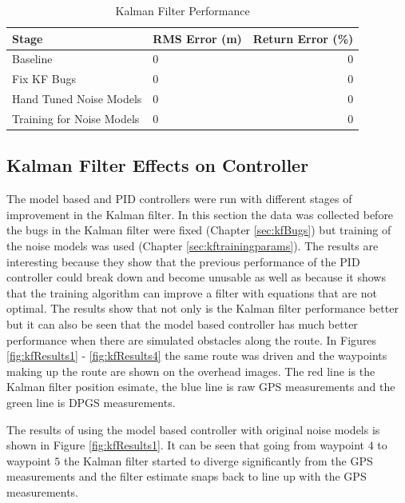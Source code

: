 \begin{table}[ht!]
\caption{Kalman Filter Performance}
\small
\centering
\begin{tabular}{@{}llr@{}} \toprule
Stage                       & RMS Error (m)  & Return Error (\%) \\ \midrule
Baseline                    & 0              & 0                 \\
Fix KF Bugs                 & 0              & 0                 \\
Hand Tuned Noise Models     & 0              & 0                 \\
Training for Noise Models   & 0              & 0                 \\ \bottomrule
\end{tabular}
\label{tab:resultsKF}
\end{table}

\subsection{Kalman Filter Effects on Controller}
The model based and PID controllers were run with different stages of improvement in the Kalman filter. In this section the data was collected before the bugs in the Kalman filter were fixed (Chapter \ref{sec:kfBugs}) but training of the noise models was used (Chapter \ref{sec:kftrainingparams}). The results are interesting because they show that the previous performance of the PID controller could break down and become unusable as well as because it shows that the training algorithm can improve a filter with equations that are not optimal. The results show that not only is the Kalman filter performance better but it can also be seen that the model based controller has much better performance when there are simulated obstacles along the route. In Figures \ref{fig:kfResults1} - \ref{fig:kfResults4} the same route was driven and the waypoints making up the route are shown on the overhead images. The red line is the Kalman filter position esimate, the blue line is raw GPS measurements and the green line is DPGS measurements.

The results of using the model based controller with original noise models is shown in Figure \ref{fig:kfResults1}. It can be seen that going from waypoint $4$ to waypoint $5$ the Kalman filter started to diverge significantly from the GPS measurements and the filter estimate snaps back to line up with the GPS measurements.

